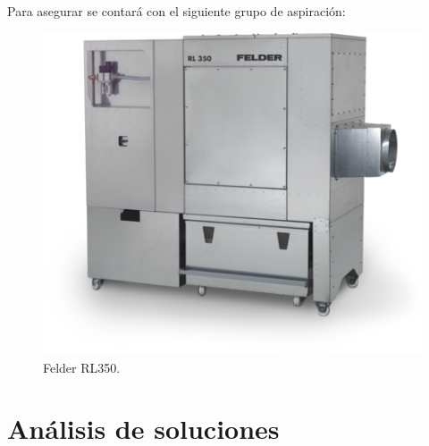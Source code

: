 \documentclass[../main.tex]{subfiles}
\begin{document}
Para asegurar se contará con el siguiente grupo de aspiración:
\begin{figure}[H]
    \centering
    \includegraphics[width=0.5\linewidth]{Imagenes/GrupoAspiracion.png}
    \caption{Felder RL350.}
\end{figure}
\section{Análisis de soluciones}
\end{document}
